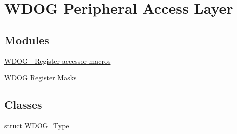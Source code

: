 \hypertarget{group__WDOG__Peripheral__Access__Layer}{}\section{W\+D\+OG Peripheral Access Layer}
\label{group__WDOG__Peripheral__Access__Layer}
\subsection*{Modules}
\begin{DoxyCompactItemize}
\item 
\hyperlink{group__WDOG__Register__Accessor__Macros}{W\+D\+O\+G -\/ Register accessor macros}
\item 
\hyperlink{group__WDOG__Register__Masks}{W\+D\+O\+G Register Masks}
\end{DoxyCompactItemize}
\subsection*{Classes}
\begin{DoxyCompactItemize}
\item 
struct \hyperlink{structWDOG__Type}{W\+D\+O\+G\+\_\+\+Type}
\end{DoxyCompactItemize}
